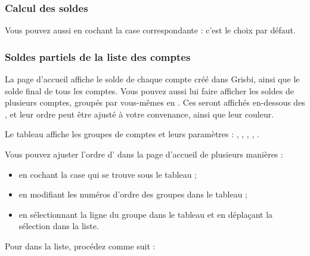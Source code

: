 \subsubsection{Calcul des soldes\label{setup-general-home-balance}}

Vous pouvez aussi  en cochant la case correspondante : c'est le choix par défaut.


\subsubsection{Soldes partiels de la liste des comptes\label{setup-general-home-partBalance}}

La page d'accueil affiche le solde de chaque compte créé dans Grisbi, ainsi que le solde final de tous les comptes. Vous pouvez aussi lui faire afficher les soldes de plusieurs comptes, groupés par vous-mêmes en . Ces  seront affichés en-dessous des , et leur ordre peut être ajusté à votre convenance, ainsi que leur couleur.

Le tableau  affiche les groupes de comptes et leurs paramètres : , , , , .

Vous pouvez ajuster l'ordre d' dans la page d'accueil de plusieurs manières :

\begin{itemize}
	\item en cochant la case  qui se trouve sous le tableau ;
	\item en modifiant les numéros d'ordre des groupes dans le tableau ;
	\item en sélectionnant la ligne du groupe dans le tableau et en déplaçant la sélection dans la liste.
\end{itemize}

\ifIllustration
\newpage
\fi


Pour  dans la liste, procédez comme suit :

